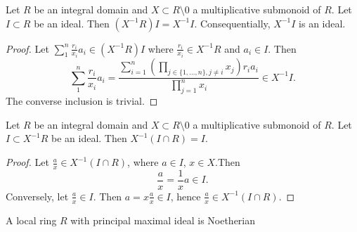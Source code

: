\begin{lemma}\label{LocalizationIdealsDescribeIdealsGeneratedFromIdealsInSubring}
    Let $R$ be an integral domain and $X\subset R\setminus 0$ a multiplicative submonoid of $R$. Let $I\subset R$ be an ideal. Then $(X^{-1}R)I = X^{-1}I$. Consequentially, $X^{-1}I$ is an ideal.
\end{lemma}
\begin{proof}
    Let $\sum_1^n \frac{r_i}{x_i}a_i\in (X^{-1}R)I$ where $\frac{r_i}{x_i}\in X^{-1}R$ and $a_i\in I$. Then 
    $$\sum_1^n \frac{r_i}{x_i}a_i= \frac{\sum_{i=1}^n\left(\prod_{j\in \{1,\dots,n\}, j\neq i} x_j\right) r_ia_i}{\prod_{j=1}^n x_i}\in X^{-1}I.$$
    The converse inclusion is trivial. 
\end{proof}
\begin{lemma}\label{LocalizationOfEliminationIdealGenerateOriginalIdeal}
    Let $R$ be an integral domain and $X\subset R\setminus 0$ a multiplicative submonoid of $R$. Let $I\subset X^{-1}R$ be an ideal. Then $X^{-1}(I\cap R) = I$.
\end{lemma}
\begin{proof}
    Let $\frac{a}{x}\in X^{-1}(I\cap R)$, where $a\in I$, $x\in X$.Then 
    $$\frac{a}{x}=\frac{1}{x}a\in I.$$
    Conversely, let $\frac{a}{x}\in I$. Then $a=x\frac{a}{x}\in I$, hence $\frac{a}{x}\in X^{-1}(I\cap R)$.
\end{proof}
    \begin{lemma}
        A local ring $R$ with principal maximal ideal is Noetherian 
    \end{lemma}
